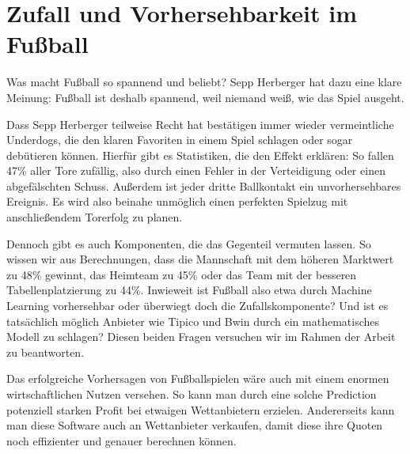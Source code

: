 \chapter{Zufall und Vorhersehbarkeit im Fußball}
	
Was macht Fußball so spannend und beliebt? Sepp Herberger hat dazu eine klare Meinung:
\glqq Fußball ist deshalb spannend, weil niemand weiß, wie das Spiel ausgeht.\grqq 

Dass Sepp Herberger teilweise Recht hat bestätigen immer wieder vermeintliche Underdogs, die den klaren Favoriten in einem Spiel schlagen oder sogar debütieren können. Hierfür gibt es Statistiken, die den Effekt erklären: So fallen 47\% aller Tore zufällig, also durch einen Fehler in der Verteidigung oder einen abgefälschten Schuss. Außerdem ist jeder dritte Ballkontakt ein unvorhersehbares Ereignis. Es wird also beinahe unmöglich einen perfekten Spielzug mit anschließendem Torerfolg zu planen.

Dennoch gibt es auch Komponenten, die das Gegenteil vermuten lassen.
So wissen wir aus Berechnungen, dass die Mannschaft mit dem höheren Marktwert zu 48\% gewinnt, das Heimteam zu 45\% oder das Team mit der besseren Tabellenplatzierung zu 44\%. 
Inwieweit ist Fußball also etwa durch Machine Learning vorhersehbar oder überwiegt doch die Zufallskomponente? Und ist es tatsächlich möglich Anbieter wie Tipico und Bwin durch ein mathematisches Modell zu schlagen? Diesen beiden Fragen versuchen wir im Rahmen der Arbeit zu beantworten.

Das erfolgreiche Vorhersagen von Fußballspielen wäre auch mit einem enormen wirtschaftlichen Nutzen versehen. So kann man durch eine solche Prediction potenziell starken Profit bei etwaigen Wettanbietern erzielen. Andererseits kann man diese Software auch an Wettanbieter verkaufen, damit diese ihre Quoten noch effizienter und genauer berechnen können.


